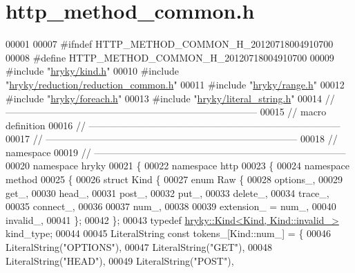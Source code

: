 \hypertarget{http__method__common_8h_source}{\section{http\-\_\-method\-\_\-common.\-h}
}

\begin{DoxyCode}
00001 
00007 \textcolor{preprocessor}{#ifndef HTTP\_METHOD\_COMMON\_H\_20120718004910700}
00008 \textcolor{preprocessor}{}\textcolor{preprocessor}{#define HTTP\_METHOD\_COMMON\_H\_20120718004910700}
00009 \textcolor{preprocessor}{}\textcolor{preprocessor}{#include "\hyperlink{kind_8h}{hryky/kind.h}"}
00010 \textcolor{preprocessor}{#include "\hyperlink{reduction__common_8h}{hryky/reduction/reduction_common.h}"}
00011 \textcolor{preprocessor}{#include "\hyperlink{range_8h}{hryky/range.h}"}
00012 \textcolor{preprocessor}{#include "\hyperlink{foreach_8h}{hryky/foreach.h}"}
00013 \textcolor{preprocessor}{#include "\hyperlink{literal__string_8h}{hryky/literal_string.h}"}
00014 \textcolor{comment}{//
      ------------------------------------------------------------------------------}
00015 \textcolor{comment}{// macro definition}
00016 \textcolor{comment}{//
      ------------------------------------------------------------------------------}
00017 \textcolor{comment}{//
      ------------------------------------------------------------------------------}
00018 \textcolor{comment}{// namespace}
00019 \textcolor{comment}{//
      ------------------------------------------------------------------------------}
00020 \textcolor{keyword}{namespace }hryky
00021 \{
00022 \textcolor{keyword}{namespace }http
00023 \{
00024 \textcolor{keyword}{namespace }method
00025 \{
00026     \textcolor{keyword}{struct }Kind \{
00027         \textcolor{keyword}{enum} Raw \{
00028             options\_,
00029             get\_,
00030             head\_,
00031             post\_,
00032             put\_,
00033             delete\_,
00034             trace\_,
00035             connect\_,
00036 
00037             num\_,
00038 
00039             extension\_ = num\_,
00040             invalid\_,
00041         \};
00042     \};
00043     \textcolor{keyword}{typedef} \hyperlink{classhryky_1_1_kind}{hryky::Kind<Kind, Kind::invalid_>} kind\_type;
00044 
00045     LiteralString \textcolor{keyword}{const} tokens\_[Kind::num\_] = \{
00046         LiteralString(\textcolor{stringliteral}{"OPTIONS"}),
00047         LiteralString(\textcolor{stringliteral}{"GET"}),
00048         LiteralString(\textcolor{stringliteral}{"HEAD"}),
00049         LiteralString(\textcolor{stringliteral}{"POST"}),

\end{DoxyCode}
